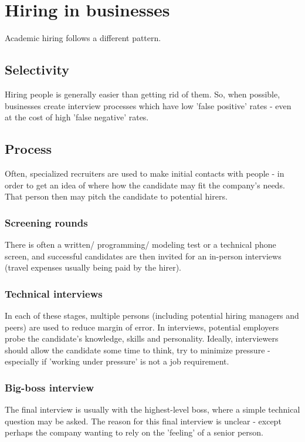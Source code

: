 \documentclass[oneside, article]{memoir}
\begin{document}
\section{Hiring in businesses}
Academic hiring follows a different pattern.

\subsection{Selectivity}
Hiring people is generally easier than getting rid of them. So, when possible, businesses create interview processes which have low 'false positive' rates - even at the cost of high 'false negative' rates.

\subsection{Process}
Often, specialized recruiters are used to make initial contacts with people - in order to get an idea of where how the candidate may fit the company's needs. That person then may pitch the candidate to potential hirers.

\subsubsection{Screening rounds}
There is often a written/ programming/ modeling test or a technical phone screen, and successful candidates are then invited for an in-person interviews (travel expenses usually being paid by the hirer).

\subsubsection{Technical interviews}
In each of these stages, multiple persons (including potential hiring managers and peers) are used to reduce margin of error. In interviews, potential employers probe the candidate's knowledge, skills and personality. Ideally, interviewers should allow the candidate some time to think, try to minimize pressure - especially if 'working under pressure' is not a job requirement.

\subsubsection{Big-boss interview}
The final interview is usually with the highest-level boss, where a simple technical question may be asked. The reason for this final interview is unclear - except perhaps the company wanting to rely on the 'feeling' of a senior person.
\end{document}
